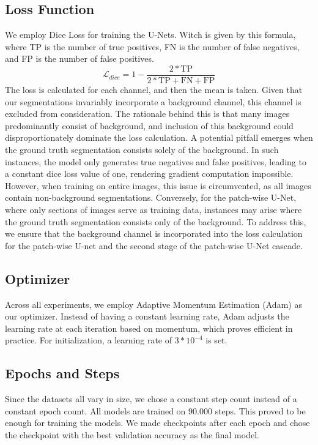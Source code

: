 \subsection{Loss Function}
We employ Dice Loss for training the U-Nets. Witch is given by this formula, where TP is the number of true positives, FN is the number of false negatives, and FP is the number of false positives.
$$\mathcal{L}_{dice}=1-\frac{2*\text{TP}}{2*\text{TP}+\text{FN}+\text{FP}}$$
The loss is calculated for each channel, and then the mean is taken.
Given that our segmentations invariably incorporate a background channel, this channel is excluded from consideration.
The rationale behind this is that many images predominantly consist of background, and inclusion of this background could disproportionately dominate the loss calculation.
A potential pitfall emerges when the ground truth segmentation consists solely of the background. In such instances, the model only generates true negatives and false positives,
leading to a constant dice loss value of one, rendering gradient computation impossible. However, when training on entire images, this issue is circumvented, as all images contain non-background segmentations.
Conversely, for the patch-wise U-Net, where only sections of images serve as training data, instances may arise where the ground truth segmentation consists only of the background. To address this,
we ensure that the background channel is incorporated into the loss calculation for the patch-wise U-net and the second stage of the patch-wise U-Net cascade.

\subsection{Optimizer}
Across all experiments, we employ Adaptive Momentum Estimation (Adam)\cite{kingma_adam_2017} as our optimizer.
Instead of having a constant learning rate, Adam adjusts the learning rate at each iteration based on momentum,
which proves efficient in practice. For initialization, a learning rate of $3*10^{-4}$ is set.

\subsection{Epochs and Steps}
Since the datasets all vary in size, we chose a constant step count instead of a constant epoch count.
All models are trained on $90.000$ steps. This proved to be enough for training the models.
We made checkpoints after each epoch and chose the checkpoint with the best validation accuracy as the final model.

